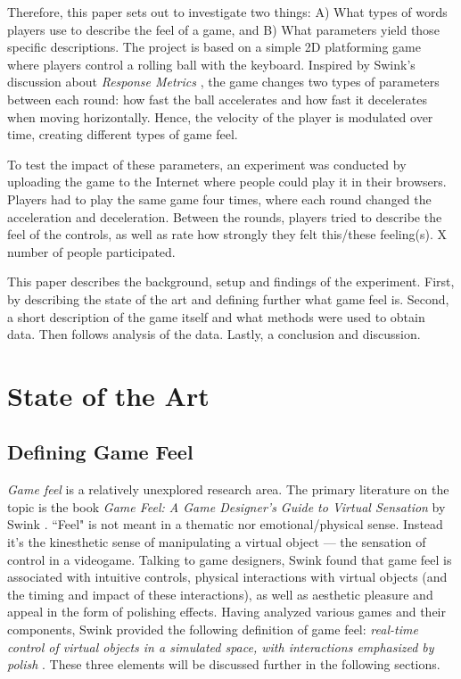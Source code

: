 Therefore, this paper sets out to investigate two things: A) What types of words players use to describe the feel of a game, and B) What parameters yield those specific descriptions. The project is based on a simple 2D platforming game where players control a rolling ball with the keyboard. Inspired by Swink's discussion  about \textit{Response Metrics} \cite{swink}, the game changes two types of parameters between each round: how fast the ball accelerates and how fast it decelerates when moving horizontally. Hence, the velocity of the player is modulated over time, creating different types of game feel.


To test the impact of these parameters, an experiment was conducted by uploading the game to the Internet where people could play it in their browsers. Players had to play the same game four times, where each round changed the acceleration and deceleration. Between the rounds, players  tried to describe the feel of the controls, as well as rate how strongly they felt this/these feeling(s). X number of people participated.

This paper describes the background, setup and findings of the experiment. First, by describing the state of the art and defining further what game feel is. Second, a short description of the game itself and what methods were used to obtain data. Then follows analysis of the data. Lastly, a conclusion and discussion.

\section{State of the Art}
\subsection{Defining Game Feel}
\textit{Game feel} is a relatively unexplored research area. The primary literature on the topic is the book \textit{Game Feel: A Game Designer's Guide to Virtual Sensation} by Swink \cite{swink}. ``Feel" is not meant in a thematic nor emotional/physical sense. Instead it's the kinesthetic sense of manipulating a virtual object --- the sensation of control in a videogame. Talking to game designers, Swink found that game feel is associated with intuitive controls, physical interactions with virtual objects (and the timing and impact of these interactions), as well as aesthetic pleasure and appeal in the form of polishing effects. Having analyzed various games and their components, Swink provided the following definition of game feel: \textit{real-time control of virtual objects in a simulated space, with interactions emphasized by polish} \cite{swink}. These three elements will be discussed further in the following sections.


